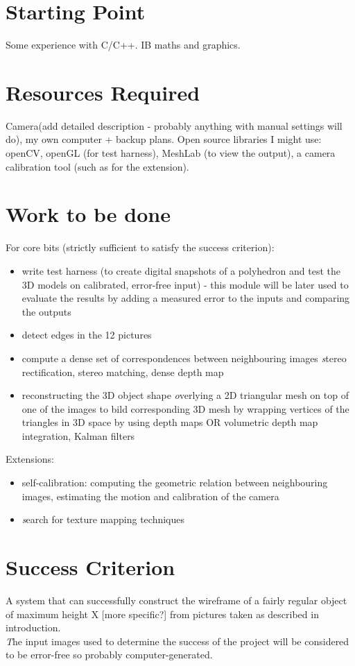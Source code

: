 \section*{Starting Point}
Some experience with C/C++.
IB maths and graphics.

\section*{Resources Required}
Camera(add detailed description - probably anything with manual settings will do), my own computer + backup plans.
Open source libraries I might use: openCV, openGL (for test harness), MeshLab (to view the output), a camera calibration tool (such as for the extension).

\section*{Work to be done}
For core bits (strictly sufficient to satisfy the success criterion):
\begin{itemize}
\item write test harness (to create digital snapshots of a polyhedron and test the 3D models on calibrated, error-free input) - this module will be later used to evaluate the results by adding a measured error to the inputs and comparing the outputs
\item detect edges in the 12 pictures
\item compute a dense set of correspondences between neighbouring images
{\emph stereo rectification, stereo matching, dense depth map}
\item reconstructing the 3D object shape
{\emph overlying a 2D triangular mesh on top of one of the images to bild corresponding 3D mesh by wrapping vertices of the triangles in 3D space by using depth maps OR volumetric depth map integration, Kalman filters}
\end{itemize}
Extensions:
\begin{itemize}
\item self-calibration: computing the geometric relation between neighbouring images, estimating the motion and calibration of the camera
\item {\emph search for texture mapping techniques}
\end{itemize}

\section*{Success Criterion}
 A system that can successfully construct the wireframe of a fairly regular object of maximum height X [more specific?] from pictures taken as described in introduction. \\ 
 {\emph The input images used to determine the success of the project will be considered to be error-free so probably computer-generated.} \\
 
